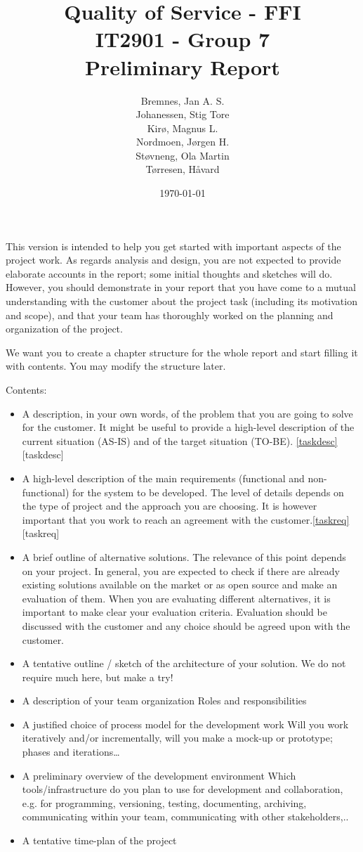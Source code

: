 \documentclass[12pt]{article}
\title{
    Quality of Service - FFI \\
    IT2901 - Group 7  \\ 
    Preliminary Report \\
}
\author{
    Bremnes, Jan A. S. \\  
    Johanessen, Stig Tore \\
    Kirø, Magnus L.\\
    Nordmoen, Jørgen H.\\ 
    Støvneng, Ola Martin  \\
    Tørresen, Håvard \\
}
\date{\today}
\begin{document}
\maketitle
\titlepage
{}

\begin{should contain}
    This version is intended to help you get started with important aspects of the project work. As regards analysis and design, you are not expected to provide elaborate accounts in the report; some initial thoughts and sketches will do. However, you should demonstrate in your report that you have come to a mutual understanding with the customer about the project task (including its motivation and scope), and that your team has thoroughly worked on the planning and organization of the project. 

    We want you to create a chapter structure for the whole report and start filling it with contents. You may modify the structure later. 

    Contents:
    \begin{itemize}
    \item A description, in your own words, of the problem that you are going to solve for the customer. It might be useful to provide a high-level description of the current situation (AS-IS) and of the target situation (TO-BE). \ref{taskdesc}[taskdesc]
    \item A high-level description of the main requirements (functional and non-functional) for the system to be developed. The level of details depends on the  type of project and the approach you are choosing. It is however important that you work to reach an agreement with the customer.\ref{taskreq}[taskreq]
    \item A brief outline of alternative solutions. The relevance of this point depends on your project. In general, you are expected to check if there are already existing solutions available on the market or as open source and make an evaluation of them. When you are evaluating different alternatives, it is important to make clear your evaluation criteria. Evaluation should be discussed with the customer and any choice should be agreed upon with the customer.
    \item A tentative outline / sketch of the architecture of your solution. 
    We do not require much here, but make a try!
    \item A description of your team organization
    Roles and responsibilities
    \item A justified choice of process model for the development work 
    Will you work iteratively and/or incrementally, will you make a mock-up or prototype; phases and iterations…
    \item A preliminary overview of the development environment 
    Which tools/infrastructure do you plan to use for development and collaboration, e.g. for programming, versioning, testing, documenting, archiving, communicating within your team, communicating with other stakeholders,..
    \item A tentative time-plan of the project
    \end{itemize}
\end{should contain}
\end{document}
